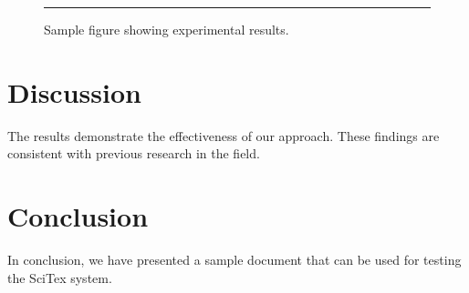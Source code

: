 \documentclass{article}
\begin{document}
\begin{figure}
\centering
\rule{8cm}{6cm} %
\caption{Sample figure showing experimental results.}
\label{fig:sample}
\end{figure}

\section{Discussion}

The results demonstrate the effectiveness of our approach. These findings are consistent with previous research in the field.

\section{Conclusion}

In conclusion, we have presented a sample document that can be used for testing the SciTex system.
\end{document}
